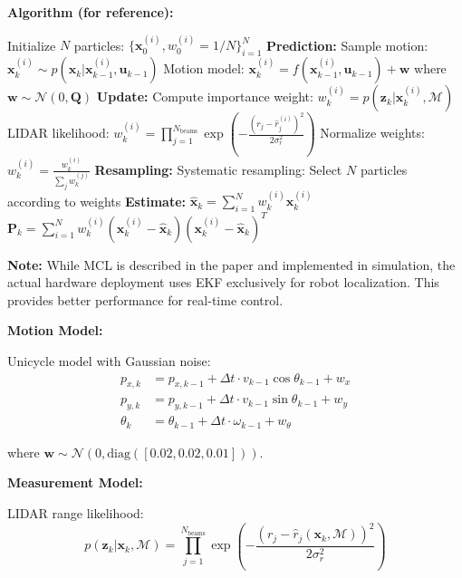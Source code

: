 \documentclass[11pt]{article}
\begin{document}
\textbf{Algorithm (for reference):}

\begin{algorithm}[H]
\caption{Monte Carlo Localization}
\begin{algorithmic}[1]
\State Initialize $N$ particles: $\{\mathbf{x}_0^{(i)}, w_0^{(i)} = 1/N\}_{i=1}^N$
    \State \textbf{Prediction:}
        \State Sample motion: $\mathbf{x}_k^{(i)} \sim p(\mathbf{x}_k | \mathbf{x}_{k-1}^{(i)}, \mathbf{u}_{k-1})$
        \State Motion model: $\mathbf{x}_k^{(i)} = f(\mathbf{x}_{k-1}^{(i)}, \mathbf{u}_{k-1}) + \mathbf{w}$
        \State where $\mathbf{w} \sim \mathcal{N}(0, \mathbf{Q})$
    \EndFor
    \State \textbf{Update:}
        \State Compute importance weight: $w_k^{(i)} = p(\mathbf{z}_k | \mathbf{x}_k^{(i)}, \mathcal{M})$
        \State LIDAR likelihood: $w_k^{(i)} = \prod_{j=1}^{N_{\text{beams}}} \exp\left(-\frac{(r_j - \hat{r}_j^{(i)})^2}{2\sigma_r^2}\right)$
    \EndFor
    \State Normalize weights: $w_k^{(i)} = \frac{w_k^{(i)}}{\sum_j w_k^{(j)}}$
    \State \textbf{Resampling:}
    \State Systematic resampling: Select $N$ particles according to weights
    \State \textbf{Estimate:}
    \State $\hat{\mathbf{x}}_k = \sum_{i=1}^N w_k^{(i)} \mathbf{x}_k^{(i)}$
    \State $\mathbf{P}_k = \sum_{i=1}^N w_k^{(i)} (\mathbf{x}_k^{(i)} - \hat{\mathbf{x}}_k)(\mathbf{x}_k^{(i)} - \hat{\mathbf{x}}_k)^T$
\EndLoop
\end{algorithmic}
\end{algorithm}

\textbf{Note:} While MCL is described in the paper and implemented in simulation, the actual hardware deployment uses EKF exclusively for robot localization. This provides better performance for real-time control.

\textbf{Motion Model:}

Unicycle model with Gaussian noise:
\begin{align}
p_{x,k} &= p_{x,k-1} + \Delta t \cdot v_{k-1} \cos\theta_{k-1} + w_x \\
p_{y,k} &= p_{y,k-1} + \Delta t \cdot v_{k-1} \sin\theta_{k-1} + w_y \\
\theta_k &= \theta_{k-1} + \Delta t \cdot \omega_{k-1} + w_\theta
\end{align}

where $\mathbf{w} \sim \mathcal{N}(0, \text{diag}([0.02, 0.02, 0.01]))$.

\textbf{Measurement Model:}

LIDAR range likelihood:
\[
p(\mathbf{z}_k | \mathbf{x}_k, \mathcal{M}) = \prod_{j=1}^{N_{\text{beams}}} \exp\left(-\frac{(r_j - \hat{r}_j(\mathbf{x}_k, \mathcal{M}))^2}{2\sigma_r^2}\right)
\]
\end{document}
